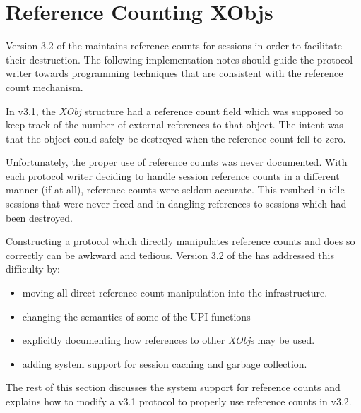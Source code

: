 %
%
%

\section{Reference Counting XObjs}
\label{refcnt}

\def\xPush{{\em xPush}}
\def\xPop{{\em xPop}}
\def\xCall{{\em xCall}}
\def\xCallPop{{\em xCallPop}}
\def\xDemux{{\em xDemux}}
\def\xOpen{{\em xOpen}}
\def\xClose{{\em xClose}}
\def\xDuplicate{{\em xDuplicate}}
\def\xCreateSessn{{\em xCreateSessn}}

Version 3.2 of the \xk{} maintains reference counts for sessions in
order to facilitate their destruction. The following implementation
notes should guide the protocol writer towards programming techniques
that are consistent with the reference count mechanism.

In v3.1, the {\em XObj} structure had a reference count field which
was supposed to keep track of the number of external references to
that object.  The intent was that the object could safely be destroyed
when the reference count fell to zero.

Unfortunately, the proper use of reference counts was never
documented.  With each protocol writer deciding to handle session
reference counts in a different manner (if at all), reference counts
were seldom accurate.  This resulted in idle sessions that were never
freed and in dangling references to sessions which had been destroyed.

Constructing a protocol which directly manipulates reference counts
and does so correctly can be awkward and tedious.  Version 3.2 of the
\xk{} has addressed this difficulty by:

\begin{itemize}
\item{}
moving all direct reference count manipulation into the \xk{}
infrastructure.  
\item{}
changing the semantics of some of the UPI functions
\item{}
explicitly documenting how references to other {\em XObj}s may
be used.
\item{}
adding system support for session caching and garbage collection. 
\end{itemize}

The rest of this section discusses the system support for reference
counts and explains how to modify a v3.1 protocol to properly use
reference counts in v3.2.


